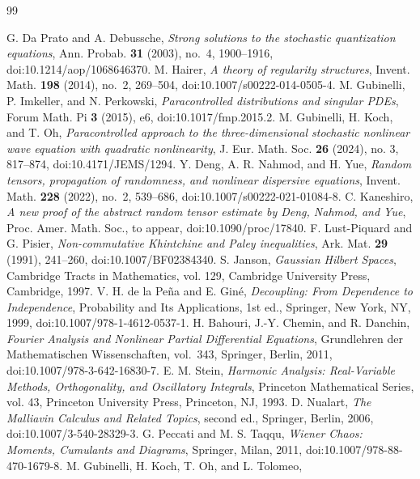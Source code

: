 \documentclass[10pt]{amsart}
\numberwithin{equation}{section}
\theoremstyle{plain}
\theoremstyle{definition}
\theoremstyle{remark}
\begin{document}
\begin{thebibliography}{99}

G. Da Prato and A. Debussche,
\emph{Strong solutions to the stochastic quantization equations},
Ann. Probab. \textbf{31} (2003), no.~4, 1900--1916, doi:10.1214/aop/1068646370.
M. Hairer,
\emph{A theory of regularity structures},
Invent. Math. \textbf{198} (2014), no.~2, 269--504, doi:10.1007/s00222-014-0505-4.
M. Gubinelli, P. Imkeller, and N. Perkowski,
\emph{Paracontrolled distributions and singular PDEs},
Forum Math. Pi \textbf{3} (2015), e6, doi:10.1017/fmp.2015.2.
M. Gubinelli, H. Koch, and T. Oh,
\emph{Paracontrolled approach to the three-dimensional stochastic nonlinear wave equation with quadratic nonlinearity},
J. Eur. Math. Soc. \textbf{26} (2024), no. 3, 817--874, doi:10.4171/JEMS/1294.
Y. Deng, A. R. Nahmod, and H. Yue,
\emph{Random tensors, propagation of randomness, and nonlinear dispersive equations},
Invent. Math. \textbf{228} (2022), no.~2, 539--686, doi:10.1007/s00222-021-01084-8.
C. Kaneshiro,
\emph{A new proof of the abstract random tensor estimate by Deng, Nahmod, and Yue},
Proc. Amer. Math. Soc., to appear, doi:10.1090/proc/17840.
F. Lust-Piquard and G. Pisier,
\emph{Non-commutative Khintchine and Paley inequalities},
Ark. Mat. \textbf{29} (1991), 241--260, doi:10.1007/BF02384340.
S. Janson,
\emph{Gaussian Hilbert Spaces},
Cambridge Tracts in Mathematics, vol. 129, Cambridge University Press, Cambridge, 1997.
V. H. de la Pe\~na and E. Gin\'e,
\emph{Decoupling: From Dependence to Independence},
Probability and Its Applications, 1st ed., Springer, New York, NY, 1999, doi:10.1007/978-1-4612-0537-1.
H. Bahouri, J.-Y. Chemin, and R. Danchin,
\emph{Fourier Analysis and Nonlinear Partial Differential Equations},
Grundlehren der Mathematischen Wissenschaften, vol.~343, Springer, Berlin, 2011, doi:10.1007/978-3-642-16830-7.
E. M. Stein,
\emph{Harmonic Analysis: Real-Variable Methods, Orthogonality, and Oscillatory Integrals},
Princeton Mathematical Series, vol. 43, Princeton University Press, Princeton, NJ, 1993.
D. Nualart,
\emph{The Malliavin Calculus and Related Topics}, second ed.,
Springer, Berlin, 2006, doi:10.1007/3-540-28329-3.
G. Peccati and M. S. Taqqu,
\emph{Wiener Chaos: Moments, Cumulants and Diagrams},
Springer, Milan, 2011, doi:10.1007/978-88-470-1679-8.
M. Gubinelli, H. Koch, T. Oh, and L. Tolomeo,

\end{thebibliography}
\end{document}
